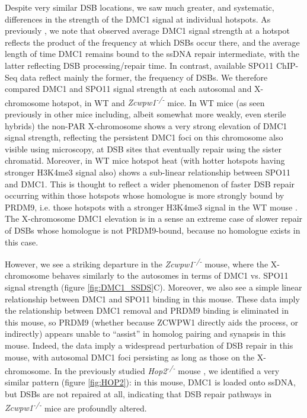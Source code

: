 Despite very similar DSB locations, we saw much greater, and systematic, differences in the strength of the DMC1 signal at individual hotspots.
As previously \parencite{Davies2016Reengineering, Khil2012Sensitive}, we note that observed average DMC1 signal strength at a hotspot reflects the product of the frequency at which DSBs occur there, and the average length of time DMC1 remains bound to the ssDNA repair intermediate, with the latter reflecting DSB processing/repair time.
In contrast, available SPO11 ChIP-Seq data \parencite{Lange2016Landscape} reflect mainly the former, the frequency of DSBs.
We therefore compared DMC1 and SPO11 signal strength at each autosomal and X-chromosome hotspot, in WT and \textit{Zcwpw1\textsuperscript{-/-}} mice.
In WT mice (as seen previously in other mice \parencite{Davies2016Reengineering} including, albeit somewhat more weakly, even sterile hybrids) the non-PAR X-chromosome shows a very strong elevation of DMC1 signal strength, reflecting the persistent DMC1 foci on this chromosome also visible using microscopy, at DSB sites that eventually repair using the sister chromatid.
Moreover, in WT mice hotspot heat (with hotter hotspots having stronger H3K4me3 signal also) shows a sub-linear relationship between SPO11 and DMC1.
This is thought to reflect a wider phenomenon of faster DSB repair occurring within those hotspots whose homologue is more strongly bound by PRDM9, i.e. those hotspots with a stronger H3K4me3 signal in the WT mouse \parencite{Davies2016Reengineering, Hinch2019Factors, Li2019highresolution}.
The X-chromosome DMC1 elevation is in a sense an extreme case of slower repair of DSBs whose homologue is not PRDM9-bound, because no homologue exists in this case.

However, we see a striking departure in the \textit{Zcwpw1\textsuperscript{-/-}} mouse, where the X-chromosome behaves similarly to the autosomes in terms of DMC1 vs. SPO11 signal strength (figure \ref{fig:DMC1_SSDS}C).
Moreover, we also see a simple linear relationship between DMC1 and SPO11 binding in this mouse.
These data imply the relationship between DMC1 removal and PRDM9 binding is eliminated in this mouse, so PRDM9 (whether because ZCWPW1 directly aids the process, or indirectly) appears unable to ``assist'' in homolog pairing and synapsis in this mouse.
Indeed, the data imply a widespread perturbation of DSB repair in this mouse, with autosomal DMC1 foci persisting as long as those on the X-chromosome.
In the previously studied \textit{Hop2\textsuperscript{-/-}} mouse \parencite{Khil2012Sensitive, Petukhova2003Hop2, Smagulova2011Genomewide}, we identified a very similar pattern (figure \ref{fig:HOP2}): in this mouse, DMC1 is loaded onto ssDNA, but DSBs are not repaired at all, indicating that DSB repair pathways in \textit{Zcwpw1\textsuperscript{-/-}} mice are profoundly altered.

